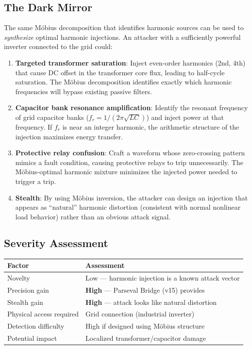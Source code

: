 \documentclass[11pt,a4paper]{article}
\begin{document}
\subsection{The Dark Mirror}

The same M\"obius decomposition that identifies harmonic sources
can be used to \emph{synthesize} optimal harmonic injections. An
attacker with a sufficiently powerful inverter connected to the
grid could:

\begin{enumerate}
  \item \textbf{Targeted transformer saturation}: Inject
    even-order harmonics (2nd, 4th) that cause DC offset in the
    transformer core flux, leading to half-cycle saturation.
    The M\"obius decomposition identifies exactly which harmonic
    frequencies will bypass existing passive filters.

  \item \textbf{Capacitor bank resonance amplification}: Identify
    the resonant frequency of grid capacitor banks
    ($f_r = 1/(2\pi\sqrt{LC})$) and inject power at that frequency.
    If $f_r$ is near an integer harmonic, the arithmetic structure
    of the injection maximizes energy transfer.

  \item \textbf{Protective relay confusion}: Craft a waveform whose
    zero-crossing pattern mimics a fault condition, causing
    protective relays to trip unnecessarily. The M\"obius-optimal
    harmonic mixture minimizes the injected power needed to trigger
    a trip.

  \item \textbf{Stealth}: By using M\"obius inversion, the attacker
    can design an injection that appears as ``natural'' harmonic
    distortion (consistent with normal nonlinear load behavior)
    rather than an obvious attack signal.
\end{enumerate}

\subsection{Severity Assessment}

\begin{center}
\begin{tabular}{@{}ll@{}}
\toprule
\textbf{Factor} & \textbf{Assessment} \\
\midrule
Novelty & Low --- harmonic injection is a known attack vector \\
Precision gain & \textbf{High} --- Parseval Bridge (v15) provides \\
Stealth gain & \textbf{High} --- attack looks like natural distortion \\
Physical access required & Grid connection (industrial inverter) \\
Detection difficulty & High if designed using M\"obius structure \\
Potential impact & Localized transformer/capacitor damage \\
\bottomrule
\end{tabular}
\end{center}
\end{document}
